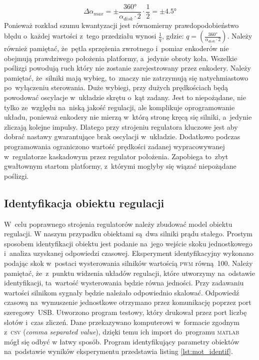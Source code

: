 \documentclass[11pt]{article}
\begin{document}
\begin{equation}
	\label{eq:err_max}
	\Delta \alpha_{max} = \pm \frac{\ang{360}}{\alpha_{disk} \cdot 2} \cdot \frac{1}{2} = \pm \ang{4,5}
\end{equation}
Ponieważ rozkład szumu kwantyzacji jest równomierny prawdopodobieństwo błędu o~każdej wartości z~tego przedziału wynosi $ \frac{1}{q} $, gdzie: $ q = {\left( \frac{\ang{360}}{\alpha_{disk} \cdot 2} \right)} $.
Należy również pamiętać, że~pętla sprzężenia zwrotnego i~pomiar enkoderów nie obejmują prawdziwego położenia platformy, a~jedynie obroty koła.
Wszelkie poślizgi powodują ruch który nie zostanie zarejestrowany przez enkodery.
Należy pamiętać, że~silniki mają wybieg, to~znaczy nie zatrzymują się natychmiastowo po~wyłączeniu sterowania.
Duże wybiegi, przy dużych prędkościach będą powodować oscylacje w~układzie skrętu o~kąt zadany.
Jest to niepożądane, nie tylko ze~względu na~niską jakość regulacji, ale komplikuje oprogramowanie układu, ponieważ enkodery nie mierzą w~którą stronę kręcą się silniki, a~jedynie zliczają kolejne impulsy.
Dlatego przy strojeniu regulatora kluczowe jest aby dobrać nastawy gwarantujące brak oscylacji w~układzie.
Dodatkowo podczas programowania ograniczono wartość prędkości zadanej wypracowywanej w~regulatorze kaskadowym przez regulator położenia.
Zapobiega to~zbyt gwałtownym startom platformy, z~którymi mogłyby się wiązać niepożądane poślizgi.

\subsection{Identyfikacja obiektu regulacji}
W~celu poprawnego strojenia regulatorów należy zbudować model obiektu regulacji.
W naszym przypadku obiektami są~dwa silniki prądu stałego.
Prostym sposobem identyfikacji obiektu jest podanie na~jego wejście skoku jednostkowego i~analiza uzyskanej odpowiedzi czasowej.
Eksperyment identyfikacyjny wykonano podając skok w~postaci wysterowania silników wartością \textsc{pwm} równą~100.
Należy pamiętać, że~z~punktu widzenia układów regulacji, które utworzymy na~odstawie identyfikacji, ta~wartość wysterowania będzie równa jedności.
Przy zadawaniu wartości silnikom sygnały będzie należało odpowiednio skalować.
Odpowiedź czasową na~wymuszenie jednostkowe otrzymano przez komunikację poprzez port szeregowy~USB.
Utworzono program testowy, który drukował przez port liczbę slotów i~czas zliczeń.
Dane przekazywano komputerowi w~formacie zgodnym z~\textsc{csv} (\textit{comma separated value}), dzięki temu ich import do~programu \textsc{matlab} mógł się odbyć w łatwy sposób.
Program identyfikujący parametry obiektów na~podstawie wyników eksperymentu przedstawia listing \ref{lst:mot_identif}.
\end{document}
